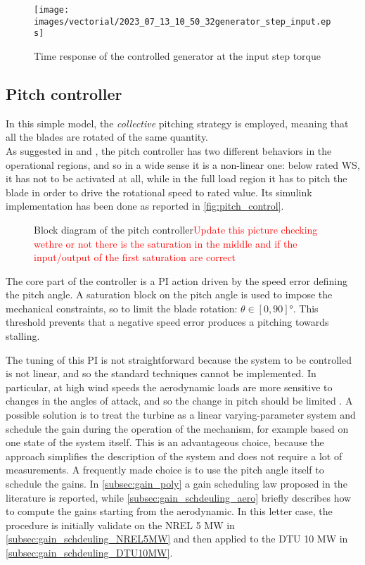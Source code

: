 \begin{figure}[htb]
  \centering
  \texttt{[image: images/vectorial/2023\_07\_13\_10\_50\_32generator\_step\_input.eps]}
  \caption{Time response of the controlled generator at the input step torque}
  \label{fig:step_response}
\end{figure}

\subsection{Pitch controller}
In this simple model, the \textit{collective} pitching strategy is employed, meaning that all the blades are rotated of the same quantity.\\
As suggested in \cite{Aerodynamics_of_wind_turbines} and \cite{SMILDEN2016386}, the pitch controller has two different behaviors in the operational regions, and so in a wide sense it is a non-linear one: below rated \acrshort{WS}, it has not to be activated at all, while in the full load region it has to pitch the blade in order to drive the rotational speed to rated value. Its simulink implementation has been done as reported in \autoref{fig:pitch_control}.
\begin{figure}[htb]
    \centering
    
    \caption{Block diagram of the pitch controller\textcolor{red}{Update this picture checking wethre or  not there is the saturation in the middle and if the input/output of the first saturation are correct}}
    \label{fig:pitch_control}
\end{figure}

The core part of the controller is a \acrfull{PI} action driven by the speed error defining the pitch angle. A saturation block on the pitch angle is used to impose the mechanical constraints, so to limit the blade rotation: $\theta \in \left[0, 90\right] \si{\degree}$. This threshold prevents that a negative speed error produces a pitching towards stalling.

The tuning of this PI is not straightforward because the system to be controlled is not linear, and so the standard techniques cannot be implemented. In particular, at high wind speeds the aerodynamic loads are more sensitive to changes in the angles of attack, and so the change in pitch should be limited \cite{Aerodynamics_of_wind_turbines}. A possible solution is to treat the turbine as a linear varying-parameter system  and schedule the gain during the operation of the mechanism, for example based on one state of the system itself. This is an advantageous choice, because the approach simplifies the description of the system and does not require a lot of measurements. A frequently made choice is to use the pitch angle itself to schedule the gains. In \autoref{subsec:gain_poly} a gain scheduling law proposed in the literature is reported, while \autoref{subsec:gain_schdeuling_aero} briefly describes how to compute the gains starting from the aerodynamic. In this letter case, the procedure is initially validate on the NREL 5 MW in \autoref{subsec:gain_schdeuling_NREL5MW} and then applied to the DTU 10 MW in \autoref{subsec:gain_schdeuling_DTU10MW}.\\


